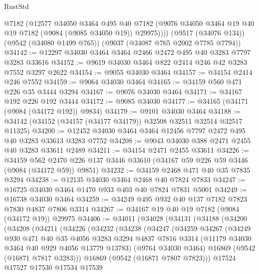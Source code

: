 \begin{lexlean}{RustStd}
\begin{coremodule}
        @7182
        (@12577
          @34050
          @3464
          @495
          @40
          @7182
          (@9076 @34050 @3464 @19 @40 @19 @7182 (@9084 (@9085 @34050 @19)) @29975))))
    (@9517 (@34076 @134))
    (@9542 (@34080 @1499 @765))
    (@9037 (@34087 @765 @2002 @7785 @7794))
@34142 := @12297 @34030 @3464 @3464 @2466 @2472 @495 @40 @3283 @7797 @3283 @33616
@34152 := @9619 @34030 @3464 @822 @2414 @246 @42 @3283 @7552 @3297 @2622
@34154 := @9055 @34030 @3464
@34157 := @34154 @2414 @246 @7552
@34159 := @9064 @34030 @3464
@34165 := @34159 @560 @471 @226 @35 @3444 @3294
@34167 := @9076 @34030 @3464
@34171 := @34167 @192 @226 @192 @3444
@34172 := @9085 @34030
@34177 := @34165 (@34171 (@9084 (@34172 @192)) @9834)
@34179 := @9101 @34030 @3464
@34188 := @34142 (@34152 (@34157 (@34177 @34179)) @32508 @32511 @32514 @32517 @11325)
@34200 := @12452 @34030 @3464 @3464 @12456 @7797 @2472 @495 @40 @3283 @33613 @3283 @7752
@34208 := @9043 @34030 @388 @2471 @2455 @40 @3283 @33611 @2489
@34211 := @34154 @2471 @2455 @33611
@34226 := @34159
    @562
    @2470
    @226
    @137
    @3446
    @33610
    (@34167 @59 @226 @59 @3446 (@9084 (@34172 @59)) @9851)
@34232 := @34159 @2468 @471 @40 @35 @7835 @3294
@34238 := @12135 @34030 @3464 @2468 @40 @7824 @7833
@34247 := @16725 @34030 @3464 @1470 @933 @403 @40 @7824 @7831 @5001
@34249 := @16738 @34030 @3464
@34259 := @34249 @495 @932 @40 @137 @7182 @7823 @7830 @4837 @7806 @3314
@34267 := @34167 @19 @40 @19 @7182 (@9084 (@34172 @19)) @29975
@34406 := @34011
    (@34028
      (@34131
        (@34188
          (@34200
            (@34208
              (@34211
                (@34226
                  (@34232
                    (@34238
                      (@34247
                        (@34259
                          @34267
                          (@34249
                            @930
                            @471
                            @40
                            @35
                            @4056
                            @3283
                            @3294
                            @4837
                            @7816
                            @3314
                            (@11179 @34030 @3464 @40 @929 @4056 @13779 @13783)
                            (@9764 @34030 @3464)
                            @16869
                            (@9542 (@16871 @7817 @3283)))
                          @16869
                          (@9542 (@16871 @7807 @7823)))
                        @17524
                        @17527
                        @17530
                        @17534
                        @17539

\end{coremodule}
\end{lexlean}
